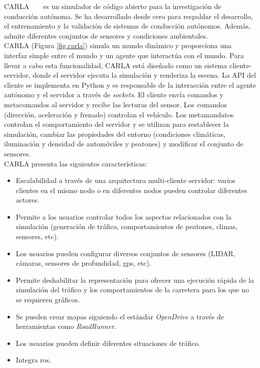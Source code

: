 CARLA ~\cite{carla} ~\cite{carla-org} es un simulador de código abierto para la investigación de conducción autónoma. Se ha desarrollado desde cero para respaldar el desarrollo, el entrenamiento y la validación de sistemas de conducción autónomos. Además, admite diferentes conjuntos de sensores y condiciones ambientales.\\

CARLA (Figura \ref{fig.carla}) simula un mundo dinámico y proporciona una interfaz simple entre el mundo y un agente que interactúa con el mundo. Para llevar a cabo esta funcionalidad, CARLA está diseñado como un sistema cliente-servidor, donde el servidor ejecuta la simulación y renderiza la escena. La API del cliente se implementa en Python y es responsable de la interacción entre el agente autónomo y el servidor a través de \textit{sockets}. El cliente envía comandos y metacomandos al servidor y recibe las lecturas del sensor. Los comandos (dirección, aceleración y frenado) controlan el vehículo. Los metamandatos controlan el comportamiento del servidor y se utilizan para restablecer la simulación, cambiar las propiedades del entorno (condiciones climáticas, iluminación y densidad de automóviles y peatones) y modificar el conjunto de sensores. \\

CARLA presenta las siguientes características:

\begin{itemize}
\item Escalabilidad a través de una arquitectura multi-cliente servidor: varios clientes en el mismo nodo o en diferentes nodos pueden controlar diferentes actores.
\item Permite a los usuarios controlar todos los aspectos relacionados con la simulación (generación de tráfico, comportamientos de peatones, climas, sensores, etc).
\item  Los usuarios pueden configurar diversos conjuntos de sensores (LIDAR, cámaras, sensores de profundidad, \acrshort{gps}, etc).
\item Permite deshabilitar la representación para ofrecer una ejecución rápida de la simulación del tráfico y los comportamientos de la carretera para los que no se requieren gráficos.
\item Se pueden crear mapas siguiendo el estándar \textit{OpenDrive} a través de herramientas como \textit{RoadRunner}.
\item Los usuarios pueden definir diferentes situaciones de tráfico.
\item Integra \acrshort{ros}.
\end{itemize}

